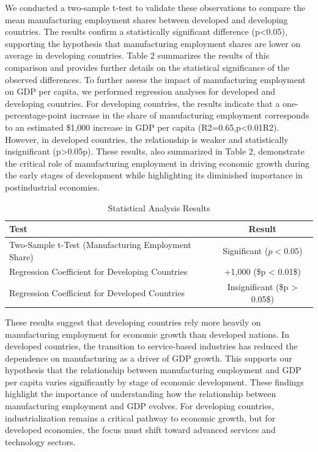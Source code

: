 \documentclass[12pt]{article}
\begin{document}
    We conducted a two-sample t-test to validate these observations to compare the mean manufacturing employment shares between developed and developing countries. The results confirm a statistically significant difference (p<0.05), supporting the hypothesis that manufacturing employment shares are lower on average in developing countries. Table 2 summarizes the results of this comparison and provides further details on the statistical significance of the observed differences. 
    To further assess the impact of manufacturing employment on GDP per capita, we performed regression analyses for developed and developing countries. For developing countries, the results indicate that a one-percentage-point increase in the share of manufacturing employment corresponds to an estimated \$1,000 increase in GDP per capita (R2=0.65,p<0.01R2). However, in developed countries, the relationship is weaker and statistically insignificant (p>0.05p). These results, also summarized in Table 2, demonstrate the critical role of manufacturing employment in driving economic growth during the early stages of development while highlighting its diminished importance in postindustrial economies.
\begin{table}[ht]
\centering
\caption{Statistical Analysis Results}
\begin{tabular}{|l|c|}
\hline
\textbf{Test} & \textbf{Result} \\ \hline
Two-Sample t-Test (Manufacturing Employment Share) & Significant ($p < 0.05$) \\ \hline
Regression Coefficient for Developing Countries & +1,000 (\$p < 0.01\$) \\ \hline
Regression Coefficient for Developed Countries & Insignificant (\$p > 0.05\$) \\ \hline
\end{tabular}
\label{table 2}
\end{table}
   
    These results suggest that developing countries rely more heavily on manufacturing employment for economic growth than developed nations. In developed countries, the transition to service-based industries has reduced the dependence on manufacturing as a driver of GDP growth. This supports our hypothesis that the relationship between manufacturing employment and GDP per capita varies significantly by stage of economic development.
    These findings highlight the importance of understanding how the relationship between manufacturing employment and GDP evolves. For developing countries, industrialization remains a critical pathway to economic growth, but for developed economies, the focus must shift toward advanced services and technology sectors.
\end{document}
